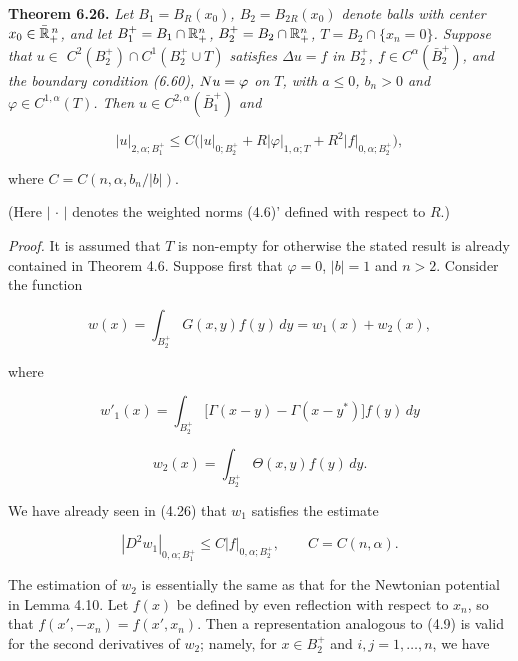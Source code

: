 \medskip

\noindent\textbf{Theorem 6.26.} \textit{Let $B_1=B_R(x_0)$, $B_2=B_{2R}(x_0)$ denote balls with center $x_0\in \bar{\mathbb{R}}^{\,n}_+$,
and let $B_1^+=B_1\cap \mathbb{R}^n_+$, $B_2^+=B_2\cap \mathbb{R}^n_+$, $T=B_2\cap\{x_n=0\}$. Suppose that $u\in$
$C^2(B_2^+)\cap C^1(B_2^+\cup T)$ satisfies $\Delta u=f$ in $B_2^+$, $f\in C^\alpha(\bar B_2^+)$, and the boundary
condition (6.60), $N u=\varphi$ on $T$, with $a\leq 0$, $b_n>0$ and $\varphi\in C^{1,\alpha}(T)$. Then $u\in C^{2,\alpha}(\bar B_1^+)$
and}

\begin{equation}
\tag{6.65}
|u|_{2,\alpha; B_1^+}\leq C\bigl(|u|_{0; B_2^+}+R|\varphi|_{1,\alpha; T}+R^2|f|_{0,\alpha; B_2^+}\bigr),
\end{equation}

\noindent where $C=C(n,\alpha,b_n/|b|)$.

\medskip

\noindent (Here $|\,\cdot\,|$ denotes the weighted norms (4.6)' defined with respect to $R$.)

\medskip

\noindent\textit{Proof.} It is assumed that $T$ is non-empty for otherwise the stated result is already
contained in Theorem 4.6. Suppose first that $\varphi=0$, $|b|=1$ and $n>2$. Consider the
function

\begin{equation*}
w(x)=\int_{B_2^+} G(x,y)f(y)\,dy=w_1(x)+w_2(x),
\end{equation*}

\noindent where

\begin{equation*}
w'_1(x)=\int_{B_2^+}\bigl[\Gamma(x-y)-\Gamma(x-y^*)\bigr]f(y)\,dy
\end{equation*}

\begin{equation*}
w_2(x)=\int_{B_2^+}\Theta(x,y)f(y)\,dy.
\end{equation*}

\noindent We have already seen in (4.26) that $w_1$ satisfies the estimate

\begin{equation}
\tag{6.66}
|D^2 w_1|_{0,\alpha; B_1^+}\leq C|f|_{0,\alpha; B_2^+}, \qquad C=C(n,\alpha).
\end{equation}

\noindent The estimation of $w_2$ is essentially the same as that for the Newtonian potential
in Lemma 4.10. Let $f(x)$ be defined by even reflection with respect to $x_n$, so that
$f(x',-x_n)=f(x',x_n)$. Then a representation analogous to (4.9) is valid for the
second derivatives of $w_2$; namely, for $x\in B_2^+$ and $i,j=1,\dots,n$, we have

